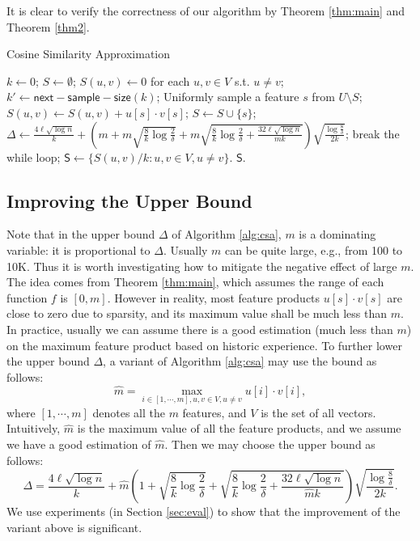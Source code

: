 \documentclass{article}
\begin{document}
It is clear to verify the correctness of our algorithm by Theorem \ref{thm:main} and Theorem \ref{thm2}.

\begin{algorithm}[!t]
\caption{\textsf{Cosine Similarity Approximation}}
\label{alg:csa}
\renewcommand{\algorithmicrequire}{\textbf{Input:}}
\renewcommand{\algorithmicensure}{\textbf{Output:}}
\begin{algorithmic}
\State $k \gets 0$;
\State $S \gets \emptyset$;
\State $S(u,v) \gets 0$ for each $u, v \in V$ s.t. $u\not= v$;
	\State $k' \gets \mathsf{next-sample-size}(k)$;
		\State Uniformly sample a feature $s$ from $U\setminus S$;
		\State $S(u,v) \gets S(u,v)+u[s]\cdot v[s]$;
		\State $S \gets S\cup \{s\}$;
	\EndFor
	\State $\Delta \gets \frac{4\ell\sqrt{\log n}}{k} +\left(m+m\sqrt{\frac{8}{k}\log \frac{2}{\delta}} + m\sqrt{\frac{8}{k}\log \frac{2}{\delta} + \frac{32\ell\sqrt{\log n}}{mk}}\right)\sqrt{\frac{\log \frac{8}{\delta}}{2k}}$;
	\If {$\Delta \leq \epsilon$}
		\State break the while loop;
	\EndIf
\EndWhile
\State $\mathsf{S} \gets \{S(u,v)/k : u,v\in V, u\not=v\}$.
 $\mathsf{S}$.
\end{algorithmic}
\end{algorithm}

\subsection{Improving the Upper Bound}
\label{sec:imprb}
Note that in the upper bound $\Delta$ of Algorithm \ref{alg:csa}, $m$ is a dominating variable: it is proportional to $\Delta$. Usually $m$ can be quite large, e.g., from 100 to 10K. Thus it is worth investigating how to mitigate the negative effect of large $m$. The idea comes from Theorem \ref{thm:main}, which assumes the range of each function $f$ is $[0,m]$. However in reality, most feature products $u[s]\cdot v[s]$ are close to zero due to sparsity, and its maximum value shall be much less than $m$. In practice, usually we can assume there is a good estimation (much less than $m$) on the maximum feature product based on historic experience. To further lower the upper bound $\Delta$, a variant of Algorithm \ref{alg:csa} may use the bound as follows:
$$\hat{m} = \max_{i\in [1,\cdots,m], u,v \in V, u\not= v}u[i]\cdot v[i],$$
where $[1,\cdots,m]$ denotes all the $m$ features, and $V$ is the set of all vectors. Intuitively, $\hat{m}$ is the maximum value of all the feature products, and we assume we have a good estimation of $\hat{m}$. 
Then we may choose the upper bound as follows:
$$\Delta = \frac{4\ell\sqrt{\log n}}{k} +\hat{m}\left(1+\sqrt{\frac{8}{k}\log \frac{2}{\delta}} + \sqrt{\frac{8}{k}\log \frac{2}{\delta} + \frac{32\ell\sqrt{\log n}}{\hat{m}k}}\right)\sqrt{\frac{\log \frac{8}{\delta}}{2k}}.$$
We use experiments (in Section \ref{sec:eval}) to show that the improvement of the variant above is significant. 
\end{document}
